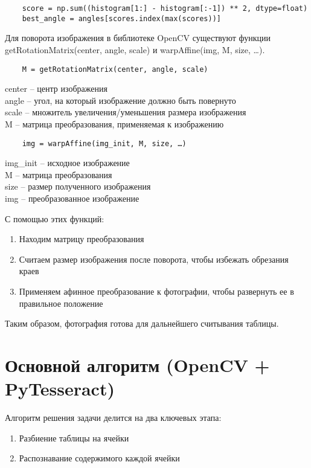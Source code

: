 \documentclass[a4paper, 12pt]{report}
\begin{document}
\begin{lstlisting}
    score = np.sum((histogram[1:] - histogram[:-1]) ** 2, dtype=float)
    best_angle = angles[scores.index(max(scores))]
\end{lstlisting}

Для поворота изображения в библиотеке OpenCV существуют функции getRotationMatrix(center, angle, scale) и warpAffine(img, M, size, …).

\begin{lstlisting}
    M = getRotationMatrix(center, angle, scale)
\end{lstlisting}
center – центр изображения\\
angle – угол, на который изображение должно быть повернуто\\
scale – множитель увеличения/уменьшения размера изображения\\
M – матрица преобразования, применяемая к изображению

\begin{lstlisting}
    img = warpAffine(img_init, M, size, …)
\end{lstlisting}
img\_init – исходное изображение\\
M – матрица преобразования\\
size – размер полученного изображения\\
img – преобразованное изображение

С помощью этих функций:
\begin{enumerate}
    \item Находим матрицу преобразования
    \item Считаем размер изображения после поворота, чтобы избежать обрезания краев
    \item Применяем афинное преобразование к фотографии, чтобы развернуть ее в правильное положение
\end{enumerate}

Таким образом, фотография готова для дальнейшего считывания таблицы.

\section{Основной алгоритм (OpenCV + PyTesseract)}

Алгоритм решения задачи делится на два ключевых этапа:
\begin{enumerate}
    \item Разбиение таблицы на ячейки
    \item Распознавание содержимого каждой ячейки
\end{enumerate}
\end{document}
